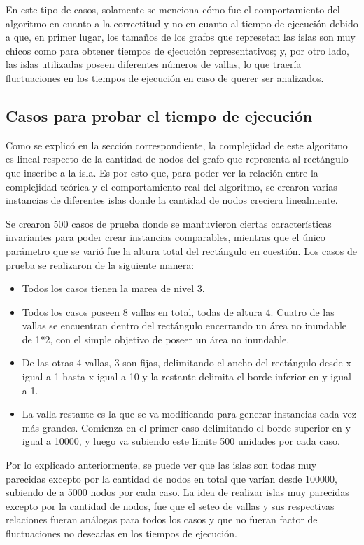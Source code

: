 \documentclass[a4paper, 12pt]{article}
\begin{document}
En este tipo de casos, solamente se menciona cómo fue el comportamiento del algoritmo en cuanto a la correctitud y no en cuanto al tiempo de ejecución debido a que, en primer lugar, los tama\~{n}os de los grafos que represetan las islas son muy chicos como para obtener tiempos de ejecución representativos; y, por otro lado, las islas utilizadas poseen diferentes números de vallas, lo que traería fluctuaciones en los tiempos de ejecución en caso de querer ser analizados.

\subsection*{Casos para probar el tiempo de ejecución}
Como se explicó en la sección correspondiente, la complejidad de este algoritmo es lineal respecto de la cantidad de nodos del grafo que representa al rectángulo que inscribe a la isla. Es por esto que, para poder ver la relación entre la complejidad teórica y el comportamiento real del algoritmo, se crearon varias instancias de diferentes islas donde la cantidad de nodos creciera linealmente.

Se crearon 500 casos de prueba donde se mantuvieron ciertas características invariantes para poder crear instancias comparables, mientras que el único parámetro que se varió fue la altura total del rectángulo en cuestión.
Los casos de prueba se realizaron de la siguiente manera:
\begin{itemize}
\item Todos los casos tienen la marea de nivel 3.
\item Todos los casos poseen 8 vallas en total, todas de altura 4. Cuatro de las vallas se encuentran dentro del rectángulo encerrando un área no inundable de 1*2, con el simple objetivo de poseer un área no inundable.
\item De las otras 4 vallas, 3 son fijas, delimitando el ancho del rectángulo desde x igual a 1 hasta x igual a 10 y la restante delimita el borde inferior en y igual a 1.
\item La valla restante es la que se va modificando para generar instancias cada vez más grandes. Comienza en el primer caso delimitando el borde superior en y igual a 10000, y luego va subiendo este límite 500 unidades por cada caso.
\end{itemize}

Por lo explicado anteriormente, se puede ver que las islas son todas muy parecidas excepto por la cantidad de nodos en total que varían desde 100000, subiendo de a 5000 nodos por cada caso. La idea de realizar islas muy parecidas excepto por la cantidad de nodos, fue que el seteo de vallas y sus respectivas relaciones fueran análogas para todos los casos y que no fueran factor de fluctuaciones no deseadas en los tiempos de ejecución.
\end{document}
